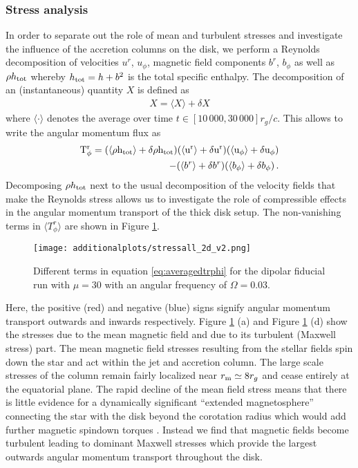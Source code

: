 \documentclass[fleqn,usenatbib]{mnras}
\begin{document}
\subsubsection{Stress analysis}
In order to separate out the role of mean and turbulent stresses and investigate the influence of the accretion columns on the disk, we perform a Reynolds decomposition of velocities $u^r$, $u_\phi$, magnetic field components $b^r$, $b_\phi$ as well as $\rho h_{\rm tot}$ whereby $h_{\rm tot} = h + b^2$ is the total specific enthalpy.  The decomposition of an (instantaneous) quantity $X$ is defined as 
\begin{align}
    X = \langle X \rangle + \delta X
\end{align}
where $\langle\cdot\rangle$ denotes the average over time $t\in[10\, 000, 30\, 000]r_g/c$.  This allows to write the angular momentum flux as 
\begin{align}
\rm{T^r_{\phi}} = (\langle \rho h_{tot} \rangle + \delta \rho h_{tot}) (\langle u^r \rangle + \delta u^r) (\langle u_{\phi} \rangle + \delta u_{\phi}) \nonumber \\
- (\langle b^r \rangle + \delta b^r) (\langle b_{\phi} \rangle + \delta b_{\phi})\, . 
\label{eq:averagedtrphi}
\end{align}
Decomposing $\rho h_{\rm tot}$ next to the usual decomposition of the velocity fields that make the Reynolds stress allows us to investigate the role of compressible effects in the angular momentum transport of the thick disk setup.  
The non-vanishing terms in $\langle T^r_{\phi} \rangle$ are shown in Figure \ref{fig:stress_2d}.  
\begin{figure}
   \centering
    \texttt{[image: additionalplots/stressall\_2d\_v2.png]}%
     \caption{Different terms in equation \ref{eq:averagedtrphi} for the dipolar fiducial run with $\mu = 30$ with an angular frequency of $\Omega = 0.03$.}
    \label{fig:stress_2d}
\end{figure}
Here, the positive (red) and negative (blue) signs signify angular momentum transport outwards and inwards respectively. Figure \ref{fig:stress_2d} (a) and Figure \ref{fig:stress_2d} (d) show the stresses due to the mean magnetic field and due to its turbulent (Maxwell stress) part. The mean magnetic field stresses resulting from the stellar fields spin down the star and act within the jet and accretion column. The large scale stresses of the column remain fairly localized near $r_{\rm m}\simeq 8 r_g$ and cease entirely at the equatorial plane. The rapid decline of the mean field stress means that there is little evidence for a dynamically significant ``extended magnetosphere'' connecting the star with the disk beyond the corotation radius which would add further magnetic spindown torques \citep{GhoshLamb1979,Zanni2009}. Instead we find that magnetic fields become turbulent leading to dominant Maxwell stresses which provide the largest outwards angular momentum transport throughout the disk.  
\end{document}
